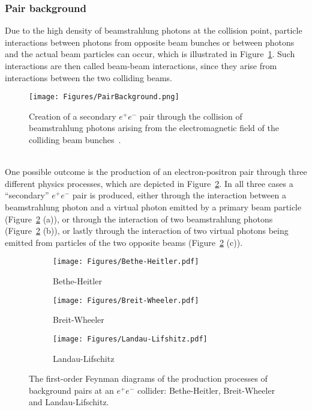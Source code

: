 \subsubsection{Pair background}
\label{BeamBeam:pairs}
Due to the high density of beamstrahlung photons at the collision point, particle interactions between photons from opposite beam bunches or between photons and the actual beam particles can occur, which is illustrated in Figure~\ref{fig:Pair_production}.
Such interactions are then called beam-beam interactions, since they arise from interactions between the two colliding beams.
\begin{figure}
\centering
\texttt{[image: Figures/PairBackground.png]}
\caption{Creation of a secondary $e^+e^-$ pair through the collision of beamstrahlung photons arising from the electromagnetic field of the colliding beam bunches~\cite[]{Vogel}.}
\label{fig:Pair_production} 
\end{figure}
\\One possible outcome is the production of an electron-positron pair through three different physics processes, which are depicted in Figure~\ref{fig:Feynman:pair_production}.
In all three cases a ``secondary'' $e^+e^-$ pair is produced, either through the interaction between a beamstrahlung photon and a virtual photon emitted by a primary beam particle (Figure~\ref{fig:Feynman:pair_production} (a)),
or through the interaction of two beamstrahlung photons (Figure~\ref{fig:Feynman:pair_production} (b)),
or lastly through the interaction of two virtual photons being emitted from particles of the two opposite beams (Figure~\ref{fig:Feynman:pair_production} (c)).
\begin{figure}[h]
\begin{subfigure}[b]{0.33\textwidth}
\texttt{[image: Figures/Bethe-Heitler.pdf]}
\caption{Bethe-Heitler}
\end{subfigure}
\begin{subfigure}[b]{0.33\textwidth}
\texttt{[image: Figures/Breit-Wheeler.pdf]}
\caption{Breit-Wheeler}
\end{subfigure}
\begin{subfigure}[b]{0.33\textwidth}
\texttt{[image: Figures/Landau-Lifshitz.pdf]}
\caption{Landau-Lifschitz}
\end{subfigure}
\caption[Feynman diagrams of the production of the background pairs.]{The first-order Feynman diagrams of the production processes of background pairs at an $e^+e^-$ collider: Bethe-Heitler, Breit-Wheeler and Landau-Lifschitz.}
\label{fig:Feynman:pair_production}
\end{figure}

